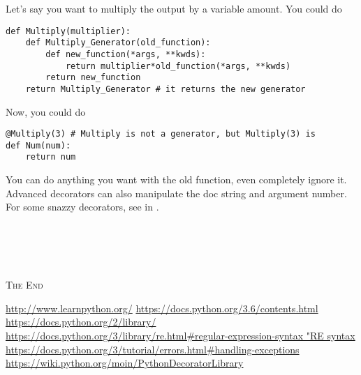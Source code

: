 \documentclass[a4paper,oneside]{book}
\numberwithin{equation}{chapter}
\begin{document}
Let's say you want to multiply the output by a variable amount. You could do
\begin{verbatim}
def Multiply(multiplier):
    def Multiply_Generator(old_function):
        def new_function(*args, **kwds):
            return multiplier*old_function(*args, **kwds)
        return new_function
    return Multiply_Generator # it returns the new generator
\end{verbatim}

Now, you could do
\begin{verbatim}
@Multiply(3) # Multiply is not a generator, but Multiply(3) is
def Num(num):
    return num
\end{verbatim}

You can do anything you want with the old function, even completely ignore it. Advanced decorators can also manipulate the doc string and argument number. For some snazzy decorators, see in \cite{6}.\\
\\
\\
\\
\\
\begin{center}
\textsc{The End}
\end{center}
\newpage
\begin{thebibliography}{999}
 \url{http://www.learnpython.org/}
 \url{https://docs.python.org/3.6/contents.html}
 \url{https://docs.python.org/2/library/}
 \url{https://docs.python.org/3/library/re.html#regular-expression-syntax "RE syntax}
 \url{https://docs.python.org/3/tutorial/errors.html#handling-exceptions}
 \url{https://wiki.python.org/moin/PythonDecoratorLibrary}
\end{thebibliography}
\end{document}

